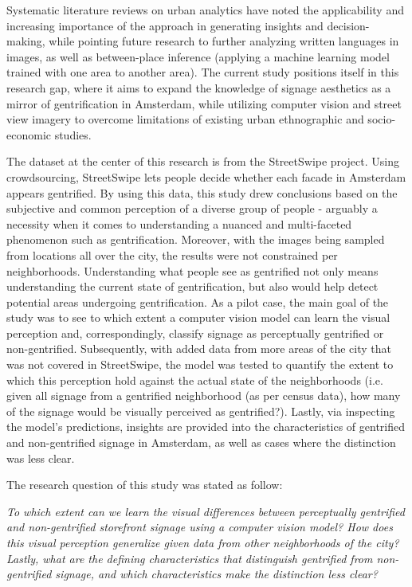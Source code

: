 Systematic literature reviews on urban analytics \cite{biljecki_street_2021, zhanga_urban_2023} have noted the applicability and increasing importance of the approach in generating insights and decision-making, while pointing future research to further analyzing written languages in images, as well as between-place inference (applying a machine learning model trained with one area to another area). The current study positions itself in this research gap, where it aims to expand the knowledge of signage aesthetics as a mirror of gentrification in Amsterdam, while utilizing computer vision and street view imagery to overcome limitations of existing urban ethnographic and socio-economic studies.

The dataset at the center of this research is from the StreetSwipe project. Using crowdsourcing, StreetSwipe \cite{streetswipe} lets people decide whether each facade in Amsterdam appears gentrified. By using this data, this study drew conclusions based on the subjective and common perception of a diverse group of people - arguably a necessity when it comes to understanding a nuanced and multi-faceted phenomenon such as gentrification. Moreover, with the images being sampled from locations all over the city, the results were not constrained per neighborhoods. Understanding what people see as gentrified not only means understanding the current state of gentrification, but also would help detect potential areas undergoing gentrification. As a pilot case, the main goal of the study was to see to which extent a computer vision model can learn the visual perception and, correspondingly, classify signage as perceptually gentrified or non-gentrified. Subsequently, with added data from more areas of the city that was not covered in StreetSwipe, the model was tested to quantify the extent to which this perception hold against the actual state of the neighborhoods (i.e. given all signage from a gentrified neighborhood (as per census data), how many of the signage would be visually perceived as gentrified?). Lastly, via inspecting the model's predictions, insights are provided into the characteristics of gentrified and non-gentrified signage in Amsterdam, as well as cases where the distinction was less clear.

The research question of this study was stated as follow: 

\noindent\textit{To which extent can we learn the visual differences between perceptually gentrified and non-gentrified storefront signage using a computer vision model? How does this visual perception generalize given data from other neighborhoods of the city? Lastly, what are the defining characteristics that distinguish gentrified from non-gentrified signage, and which characteristics make the distinction less clear?}

